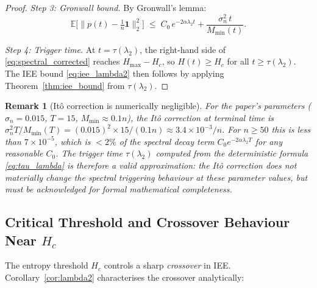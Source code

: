 \documentclass[review,12pt]{elsarticle}
\newcommand{\Hc}{H_c}
\newcommand{\Hmax}{H_{\max}}
\newcommand{\lambdat}{\lambda_2}
\newtheorem{remark}{Remark}
\begin{document}
\begin{proof}
\emph{Step 3: Gronwall bound.}
By Gronwall's lemma:
\begin{equation}
  \mathbb{E}\bigl[\|p(t) - \tfrac{1}{n}\mathbf{1}\|_2^2\bigr]
  \;\leq\;
  C_0\,e^{-2\alpha\lambdat t}
  + \frac{\sigma_n^2\,t}{M_{\min}(t)}.
  \label{eq:spectral_corrected}
\end{equation}

\emph{Step 4: Trigger time.}
At $t = \tau(\lambdat)$, the right-hand side of \eqref{eq:spectral_corrected}
reaches $\Hmax - \Hc$, so $H(t) \geq \Hc$ for all $t \geq \tau(\lambdat)$.
The IEE bound \eqref{eq:iee_lambda2} then follows by applying
Theorem~\ref{thm:iee_bound} from $\tau(\lambdat)$.
\end{proof}

\begin{remark}[Itô correction is numerically negligible]
\label{rem:ito_correction}
For the paper's parameters ($\sigma_n = 0.015$, $T=15$,
$M_{\min} \approx 0.1n$), the Itô correction at terminal time is
$\sigma_n^2 T / M_{\min}(T) = (0.015)^2 \times 15 / (0.1n) \approx
3.4\times 10^{-3}/n$.  For $n \geq 50$ this is less than $7\times 10^{-5}$,
which is $<\!2\%$ of the spectral decay term $C_0 e^{-2\alpha\lambdat T}$ for
any reasonable $C_0$.  The trigger time $\tau(\lambdat)$ computed from the
deterministic formula \eqref{eq:tau_lambda} is therefore a valid
approximation: the Itô correction does not materially change the spectral
triggering behaviour at these parameter values, but must be acknowledged for
formal mathematical completeness.
\end{remark}

\subsection{Critical Threshold and Crossover Behaviour Near $\Hc$}
\label{sec:phase_transition}

The entropy threshold $\Hc$ controls a sharp \emph{crossover} in IEE.
Corollary~\ref{cor:lambda2} characterises the crossover analytically:
\end{document}
